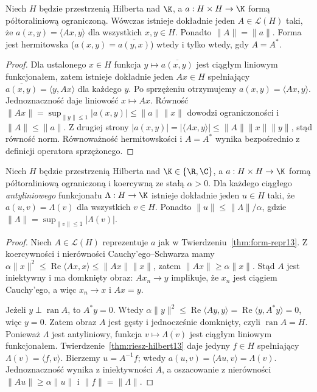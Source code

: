 \begin{twierdzenie}
\label{thm:form-repr13}
Niech $H$ będzie przestrzenią Hilberta nad $\K$,
a $a:H\times H\to\K$ formą półtoraliniową ograniczoną.
Wówczas istnieje dokładnie jeden $A\in\mathcal L(H)$ taki, że
$a(x,y)=\langle Ax,y\rangle$ dla wszystkich $x,y\in H$.
Ponadto $\|A\|=\|a\|$.
Forma jest hermitowska ($a(x,y)=\overline{a(y,x)}$) wtedy
i tylko wtedy, gdy $A=A^*$.
\end{twierdzenie}
\begin{proof}
Dla ustalonego $x\in H$ funkcja
$y\mapsto\overline{a(x,y)}$ jest ciągłym liniowym funkcjonałem,
zatem istnieje dokładnie jeden $Ax\in H$ spełniający
$\overline{a(x,y)}=\langle y,Ax\rangle$ dla każdego $y$.
Po sprzężeniu otrzymujemy $a(x,y)=\langle Ax,y\rangle$.
Jednoznaczność daje liniowość $x\mapsto Ax$.
Równość $\|Ax\|=\sup_{\|y\|\le1}|a(x,y)|\le\|a\|\|x\|$
dowodzi ograniczoności i $\|A\|\le\|a\|$.
Z drugiej strony
$|a(x,y)|=|\langle Ax,y\rangle|\le\|A\|\|x\|\|y\|$,
stąd równość norm. Równoważność hermitowskości i $A=A^*$
wynika bezpośrednio z definicji operatora sprzężonego.
\end{proof}

\begin{twierdzenie}
\label{thm:lax-milgram13}
Niech $H$ będzie przestrzenią Hilberta nad $\K\in\{\R,\C\}$,
a $a:H\times H\to\K$ formą półtoraliniową ograniczoną
i koercywną ze stałą $\alpha>0$. Dla każdego ciągłego
\emph{antyliniowego} funkcjonału $\Lambda:H\to\K$ istnieje
dokładnie jeden $u\in H$ taki, że
$a(u,v)=\Lambda(v)$ dla wszystkich $v\in H$.
Ponadto $\|u\|\le\|\Lambda\|/\alpha$, gdzie
$\|\Lambda\|=\sup_{\|v\|\le1}|\Lambda(v)|$.
\end{twierdzenie}
\begin{proof}
Niech $A\in\mathcal L(H)$ reprezentuje $a$ jak w
Twierdzeniu~\ref{thm:form-repr13}. Z koercywności i nierówności
Cauchy'ego--Schwarza mamy
$\alpha\|x\|^2\le\operatorname{Re}\langle Ax,x\rangle
\le\|Ax\|\|x\|$, zatem $\|Ax\|\ge\alpha\|x\|$.
Stąd $A$ jest iniektywny i ma domknięty obraz:
$Ax_n\to y$ implikuje, że $x_n$ jest ciągiem Cauchy'ego,
a więc $x_n\to x$ i $Ax=y$.

Jeżeli $y\perp\operatorname{ran}A$, to $A^*y=0$.
Wtedy
$\alpha\|y\|^2\le\operatorname{Re}\langle Ay,y\rangle
=\operatorname{Re}\langle y,A^*y\rangle=0$,
więc $y=0$. Zatem obraz $A$ jest gęsty i jednocześnie
domknięty, czyli $\operatorname{ran}A=H$.
Ponieważ $\Lambda$ jest antyliniowy, funkcja
$v\mapsto\overline{\Lambda(v)}$ jest ciągłym liniowym
funkcjonałem. Twierdzenie~\ref{thm:riesz-hilbert13} daje
jedyny $f\in H$ spełniający $\Lambda(v)=\langle f,v\rangle$.
Bierzemy $u=A^{-1}f$; wtedy $a(u,v)=\langle Au,v\rangle
=\Lambda(v)$. Jednoznaczność wynika z iniektywności $A$,
a oszacowanie z nierówności $\|Au\|\ge\alpha\|u\|$
i $\|f\|=\|\Lambda\|$.
\end{proof}


